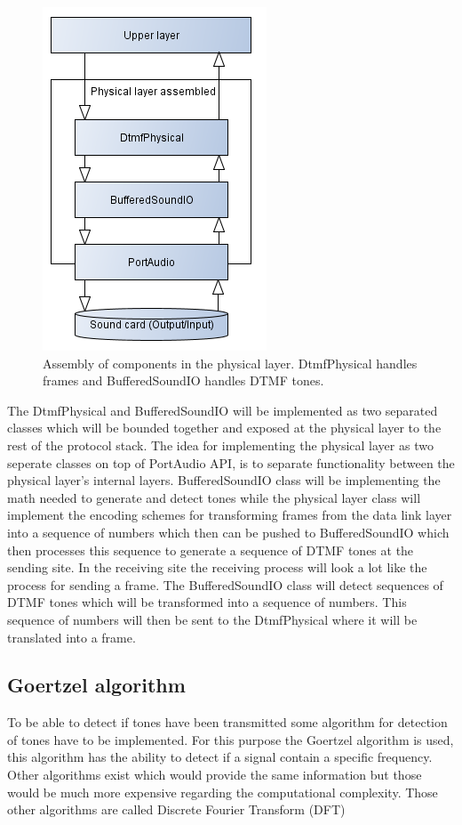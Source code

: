 	\begin{figure}[htb]
		\begin{center}
		\includegraphics[scale=0.6,trim=0 0 0 0]{content/graphics/physical/physical_4layers.png}%
		\caption{Assembly of components in the physical layer. DtmfPhysical handles frames and BufferedSoundIO handles DTMF tones.}
		\label{fig:physical_4layers}
		\end{center}
	\end{figure}
	
	The DtmfPhysical and BufferedSoundIO will be implemented as two separated classes which will be bounded together
	and exposed at the physical layer to the rest of the protocol stack. The idea for implementing the physical layer
	as two seperate classes on top of PortAudio API, is to separate functionality between the physical layer's internal
	layers. BufferedSoundIO class will be implementing the math needed to generate and detect tones while the physical
	layer class will implement the encoding schemes for transforming frames from the data link layer into a sequence of
	numbers which then can be pushed to BufferedSoundIO which then processes this sequence to generate a sequence of DTMF
	tones at the sending site. In the receiving site the receiving process will look a lot like the process for sending a
	frame. The BufferedSoundIO class will detect sequences of DTMF tones which will be transformed into a sequence of
	numbers. This sequence of numbers will then be sent to the DtmfPhysical where it will be translated into a frame.
	
	\subsection{Goertzel algorithm}
	To be able to detect if tones have been transmitted some algorithm for detection of tones have to be implemented.
	For this purpose the Goertzel algorithm is used, this algorithm has the ability to detect if a signal contain a
	specific frequency. Other algorithms exist which would provide the same information but those would be
	much more expensive regarding the computational complexity. Those other algorithms are called Discrete Fourier Transform (DFT)
	
